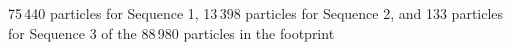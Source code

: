 75\,440 particles for Sequence 1, 13\,398 particles for Sequence 2, and 133 particles for Sequence 3 of the 88\,980 particles in the footprint%
